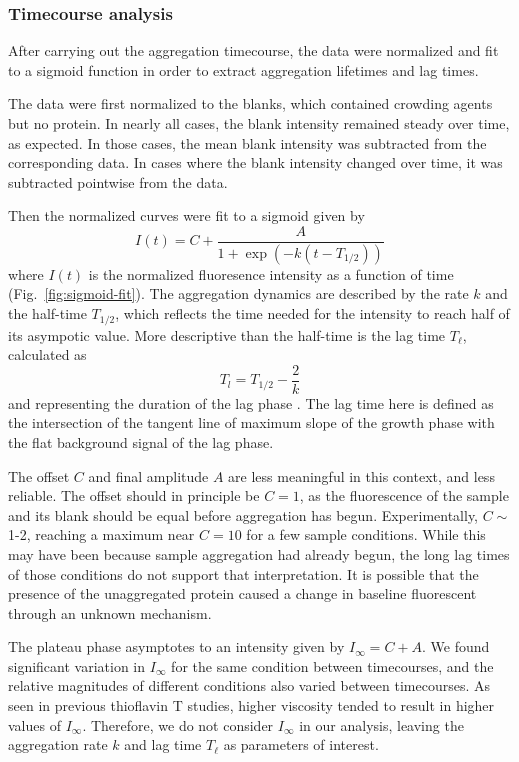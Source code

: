 \subsubsection{Timecourse analysis}

After carrying out the aggregation timecourse, the data were normalized and fit to a sigmoid function in order to extract aggregation lifetimes and lag times.

The data were first normalized to the blanks, which contained crowding agents but no protein.  In nearly all cases, the blank intensity remained steady over time, as expected.  In those cases, the mean blank intensity was subtracted from the corresponding data.  In cases where the blank intensity changed over time, it was subtracted pointwise from the data.

Then the normalized curves were fit to a sigmoid given by
\begin{equation}
I(t) = C + \frac{A}{1+\exp \left(-k(t-T_{1/2})\right)}
\label{eq:sig-fit}
\end{equation}
where $I(t)$ is the normalized fluoresence intensity as a function of time (Fig.~\ref{fig:sigmoid-fit}).  The aggregation dynamics are described by the rate $k$ and the half-time $T_{1/2}$, which reflects the time needed for the intensity to reach half of its asympotic value.  More descriptive than the half-time is the lag time $T_\ell$, calculated as
\begin{equation}
T_l = T_{1/2} - \frac{2}{k}
\end{equation}
and representing the duration of the lag phase \cite{arosio15}.  The lag time here is defined as the intersection of the tangent line of maximum slope of the growth phase with the flat background signal of the lag phase.  

The offset $C$ and final amplitude $A$ are less meaningful in this context, and less reliable.  The offset should in principle be $C=1$, as the fluorescence of the sample and its blank should be equal before aggregation has begun.   Experimentally, $C \sim$ 1-2, reaching a maximum near $C= 10$ for a few sample conditions.  While this may have been because sample aggregation had already begun, the long lag times of those conditions do not support that interpretation.  It is possible that the presence of the unaggregated protein caused a change in baseline fluorescent through an unknown mechanism.

The plateau phase asymptotes to an intensity given by $I_\infty=C+A$.  We found significant variation in $I_\infty$ for the same condition between timecourses, and the relative magnitudes of different conditions also varied between timecourses.  As seen in previous thioflavin T studies, higher viscosity tended to result in higher values of $I_\infty$. Therefore, we do not consider $I_\infty$ in our analysis, leaving the aggregation rate $k$ and lag time $T_\ell$ as parameters of interest.

